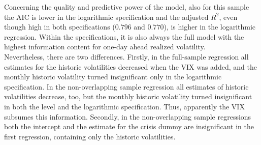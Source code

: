 Concerning the quality and predictive power of the model, also for this sample the AIC is lower in the logarithmic specification and the adjusted $R^{2}$, even though high in both specifications ($0.796$ and $0.770$), is higher in the logarithmic regression. Within the specifications, it is also always the full model with the highest information content for one-day ahead realized volatility.\\
Nevertheless, there are two differences. Firstly, in the full-sample regression all estimates for the historic volatilities decreased when the VIX was added, and the monthly historic volatility turned insignificant only in the logarithmic specification. In the non-overlapping sample regression all estimates of historic volatilities decrease, too, but the monthly historic volatility turned insignificant in both the level and the logarithmic specification. Thus, apparently the VIX subsumes this information. Secondly, in the non-overlapping sample regressions both the intercept and the estimate for the crisis dummy are insignificant in the first regression, containing only the historic volatilities.


\newpage
















